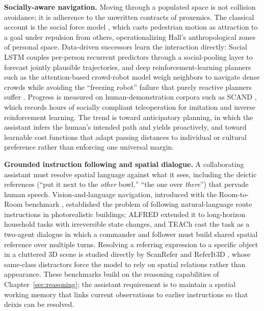 \textbf{Socially-aware navigation.} Moving through a populated space is not collision avoidance; it is adherence to the unwritten contracts of proxemics. The classical account is the social force model \cite{helbing1995social}, which casts pedestrian motion as attraction to a goal under repulsion from others, operationalizing Hall's anthropological zones of personal space. 
Data-driven successors learn the interaction directly: Social LSTM \cite{alahi2016social} couples per-person recurrent predictors through a social-pooling layer to forecast jointly plausible trajectories, and deep reinforcement-learning planners such as the attention-based crowd-robot model \cite{chen2019crowdrobot} weigh neighbors to navigate dense crowds while avoiding the ``freezing robot'' failure that purely reactive planners suffer \cite{trautman2010unfreezing}. 
Progress is measured on human-demonstration corpora such as SCAND \cite{karnan2022socially}, which records hours of socially compliant teleoperation for imitation and inverse reinforcement learning. 
The trend is toward anticipatory planning, in which the assistant infers the human's intended path and yields proactively, and toward learnable cost functions that adapt passing distances to individual or cultural preference rather than enforcing one universal margin.

\textbf{Grounded instruction following and spatial dialogue.} A collaborating assistant must resolve spatial language against what it sees, including the deictic references (``put it next to the \emph{other} bowl,'' ``the one over \emph{there}'') that pervade human speech. 
Vision-and-language navigation, introduced with the Room-to-Room benchmark \cite{anderson2018vision}, established the problem of following natural-language route instructions in photorealistic buildings; ALFRED \cite{shridhar2020alfred} extended it to long-horizon household tasks with irreversible state changes, and TEACh \cite{Padmakumar2022TEACh} cast the task as a two-agent dialogue in which a commander and follower must build shared spatial reference over multiple turns. 
Resolving a referring expression to a specific object in a cluttered 3D scene is studied directly by ScanRefer \cite{chen2020scanrefer} and ReferIt3D \cite{achlioptas2020referit3d}, whose same-class distractors force the model to rely on spatial relations rather than appearance. 
These benchmarks build on the reasoning capabilities of Chapter~\ref{sec:reasoning}; the assistant requirement is to maintain a spatial working memory that links current observations to earlier instructions so that deixis can be resolved.

